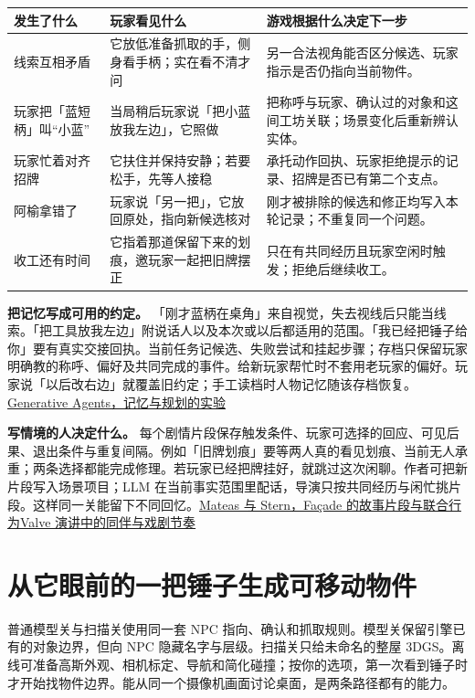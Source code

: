 \documentclass[UTF8,11pt,fontset=fandol,a4paper]{ctexart}
\newcommand{\src}[2]{\href{#1}{#2}}
\newcommand{\page}[1]{\clearpage\section{#1}}
\begin{document}
\begin{center}\small
\begin{tabularx}{\linewidth}{@{}L{31mm}YY@{}}\toprule
发生了什么 & 玩家看见什么 & 游戏根据什么决定下一步\\\midrule
线索互相矛盾 & 它放低准备抓取的手，侧身看手柄；实在看不清才问 & 另一合法视角能否区分候选、玩家指示是否仍指向当前物件。\\
玩家把「蓝短柄」叫“小蓝” & 当局稍后玩家说「把小蓝放我左边」，它照做 & 把称呼与玩家、确认过的对象和这间工坊关联；场景变化后重新辨认实体。\\
玩家忙着对齐招牌 & 它扶住并保持安静；若要松手，先等人接稳 & 承托动作回执、玩家拒绝提示的记录、招牌是否已有第二个支点。\\
阿榆拿错了 & 玩家说「另一把」，它放回原处，指向新候选核对 & 刚才被排除的候选和修正均写入本轮记录；不重复同一个问题。\\
收工还有时间 & 它指着那道保留下来的划痕，邀玩家一起把旧牌摆正 & 只在有共同经历且玩家空闲时触发；拒绝后继续收工。\\\bottomrule
\end{tabularx}
\end{center}

\textbf{把记忆写成可用的约定。} 「刚才蓝柄在桌角」来自视觉，失去视线后只能当线索。「把工具放我左边」附说话人以及本次或以后都适用的范围。「我已经把锤子给你」要有真实交接回执。当前任务记候选、失败尝试和挂起步骤；存档只保留玩家明确教的称呼、偏好及共同完成的事件。给新玩家帮忙时不套用老玩家的偏好。玩家说「以后改右边」就覆盖旧约定；手工读档时人物记忆随该存档恢复。\src{https://arxiv.org/abs/2304.03442}{Generative Agents，记忆与规划的实验}

\textbf{写情境的人决定什么。} 每个剧情片段保存触发条件、玩家可选择的回应、可见后果、退出条件与重复间隔。例如「旧牌划痕」要等两人真的看见划痕、当前无人承重；两条选择都能完成修理。若玩家已经把牌挂好，就跳过这次闲聊。作者可把新片段写入场景项目；LLM 在当前事实范围里配话，导演只按共同经历与闲忙挑片段。这样同一关能留下不同回忆。\src{https://cdn.aaai.org/ojs/18722/18722-52-22361-1-10-20210928.pdf}{Mateas 与 Stern，Façade 的故事片段与联合行为}\quad\src{https://steamcdn-a.akamaihd.net/apps/valve/2009/ai_systems_of_l4d_mike_booth.pdf}{Valve 演讲中的同伴与戏剧节奏}

\page{从它眼前的一把锤子生成可移动物件}
普通模型关与扫描关使用同一套 NPC 指向、确认和抓取规则。模型关保留引擎已有的对象边界，但向 NPC 隐藏名字与层级。扫描关只给未命名的整屋 3DGS。离线可准备高斯外观、相机标定、导航和简化碰撞；按你的选项，第一次看到锤子时才开始找物件边界。能从同一个摄像机画面讨论桌面，是两条路径都有的能力。
\end{document}
